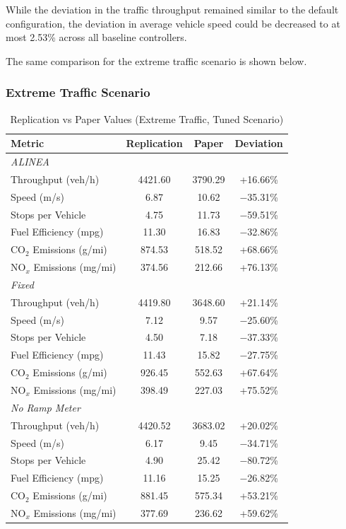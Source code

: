 While the deviation in the traffic throughput remained similar to the default configuration, the deviation in average vehicle speed could be decreased to at most 2.53\% across all baseline controllers.

The same comparison for the extreme traffic scenario is shown below.

\subsubsection{Extreme Traffic Scenario}

\begin{table}[H]
\centering
\small
\caption{Replication vs Paper Values (Extreme Traffic, Tuned Scenario)}
\begin{tabular}{l c c c}
\toprule
\textbf{Metric} & \textbf{Replication} & \textbf{Paper} & \textbf{Deviation} \\
\midrule
\multicolumn{4}{l}{\textit{ALINEA}} \\
\midrule
Throughput (veh/h)       & 4421.60 & 3790.29 & +16.66\% \\
Speed (m/s)              & 6.87    & 10.62   & $-$35.31\% \\
Stops per Vehicle        & 4.75    & 11.73   & $-$59.51\% \\
Fuel Efficiency (mpg)    & 11.30   & 16.83   & $-$32.86\% \\
CO$_2$ Emissions (g/mi)  & 874.53  & 518.52  & +68.66\% \\
NO$_x$ Emissions (mg/mi) & 374.56  & 212.66  & +76.13\% \\
\midrule
\multicolumn{4}{l}{\textit{Fixed}} \\
\midrule
Throughput (veh/h)       & 4419.80 & 3648.60 & +21.14\% \\
Speed (m/s)              & 7.12    & 9.57    & $-$25.60\% \\
Stops per Vehicle        & 4.50    & 7.18    & $-$37.33\% \\
Fuel Efficiency (mpg)    & 11.43   & 15.82   & $-$27.75\% \\
CO$_2$ Emissions (g/mi)  & 926.45  & 552.63  & +67.64\% \\
NO$_x$ Emissions (mg/mi) & 398.49  & 227.03  & +75.52\% \\
\midrule
\multicolumn{4}{l}{\textit{No Ramp Meter}} \\
\midrule
Throughput (veh/h)       & 4420.52 & 3683.02 & +20.02\% \\
Speed (m/s)              & 6.17    & 9.45    & $-$34.71\% \\
Stops per Vehicle        & 4.90    & 25.42   & $-$80.72\% \\
Fuel Efficiency (mpg)    & 11.16   & 15.25   & $-$26.82\% \\
CO$_2$ Emissions (g/mi)  & 881.45  & 575.34  & +53.21\% \\
NO$_x$ Emissions (mg/mi) & 377.69  & 236.62  & +59.62\% \\
\bottomrule
\end{tabular}
\end{table}

